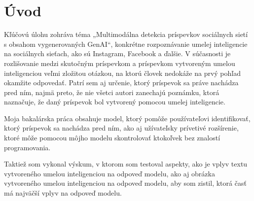 \setcounter{page}{1}
\setcounter{equation}{0}
\setcounter{figure}{0}
\setcounter{table}{0}

\section*{Úvod}
Kľúčovú úlohu zohráva téma „Multimodálna detekcia príspevkov sociálnych sietí s obsahom vygenerovaných GenAI“, konkrétne rozpoznávanie umelej inteligencie na sociálnych sieťach, ako sú Instagram, Facebook a ďalšie. V súčasnosti je rozlišovanie medzi skutočným príspevkom a príspevkom vytvoreným umelou inteligenciou veľmi zložitou otázkou, na ktorú človek nedokáže na prvý pohľad okamžite odpovedať. Patrí sem aj určenie, ktorý príspevok sa práve nachádza pred ním, najmä preto, že nie všetci autori zanechajú poznámku, ktorá naznačuje, že daný príspevok bol vytvorený pomocou umelej inteligencie. 

Moja bakalárska práca obsahuje model, ktorý pomôže používateľovi identifikovať, ktorý príspevok sa nachádza pred ním, ako aj užívateľsky prívetivé rozšírenie, ktoré môže pomocou môjho modelu skontrolovať ktokoľvek bez znalostí programovania. 

Taktiež som vykonal výskum, v ktorom som testoval aspekty, ako je vplyv textu vytvoreného umelou inteligenciou na odpoveď modelu, ako aj obrázka vytvoreného umelou inteligenciou na odpoveď modelu, aby som zistil, ktorá časť má najväčší vplyv na odpoveď modelu.